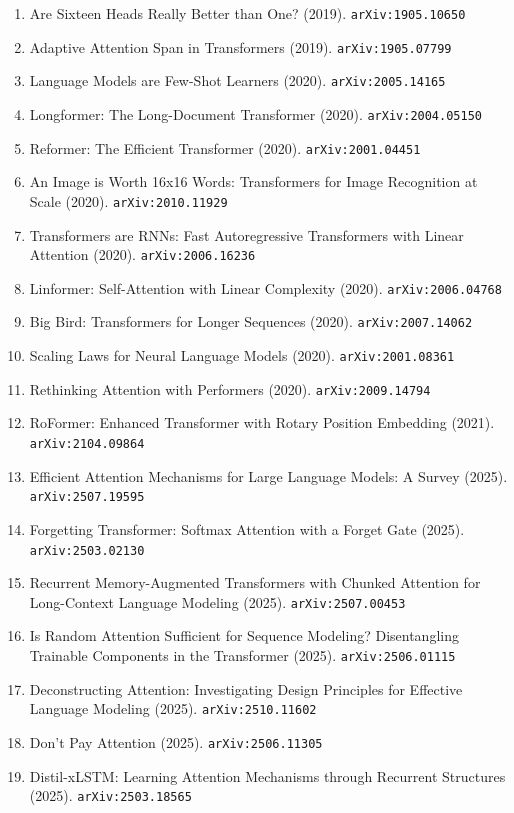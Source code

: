 \documentclass[11pt]{article}
\begin{document}
\begin{enumerate}
  \item Are Sixteen Heads Really Better than One? (2019). \texttt{arXiv:1905.10650}
  \item Adaptive Attention Span in Transformers (2019). \texttt{arXiv:1905.07799}
  \item Language Models are Few-Shot Learners (2020). \texttt{arXiv:2005.14165}
  \item Longformer: The Long-Document Transformer (2020). \texttt{arXiv:2004.05150}
  \item Reformer: The Efficient Transformer (2020). \texttt{arXiv:2001.04451}
  \item An Image is Worth 16x16 Words: Transformers for Image Recognition at
  Scale (2020). \texttt{arXiv:2010.11929}
  \item Transformers are RNNs: Fast Autoregressive Transformers with Linear
  Attention (2020). \texttt{arXiv:2006.16236}
  \item Linformer: Self-Attention with Linear Complexity (2020). \texttt{arXiv:2006.04768}
  \item Big Bird: Transformers for Longer Sequences (2020). \texttt{arXiv:2007.14062}
  \item Scaling Laws for Neural Language Models (2020). \texttt{arXiv:2001.08361}
  \item Rethinking Attention with Performers (2020). \texttt{arXiv:2009.14794}
  \item RoFormer: Enhanced Transformer with Rotary Position Embedding (2021). \texttt{arXiv:2104.09864}
  \item Efficient Attention Mechanisms for Large Language Models: A Survey (2025). \texttt{arXiv:2507.19595}
  \item Forgetting Transformer: Softmax Attention with a Forget Gate (2025). \texttt{arXiv:2503.02130}
  \item Recurrent Memory-Augmented Transformers with Chunked Attention for Long-Context Language Modeling (2025). \texttt{arXiv:2507.00453}
  \item Is Random Attention Sufficient for Sequence Modeling? Disentangling Trainable Components in the Transformer (2025). \texttt{arXiv:2506.01115}
  \item Deconstructing Attention: Investigating Design Principles for Effective Language Modeling (2025). \texttt{arXiv:2510.11602}
  \item Don't Pay Attention (2025). \texttt{arXiv:2506.11305}
  \item Distil-xLSTM: Learning Attention Mechanisms through Recurrent Structures (2025). \texttt{arXiv:2503.18565}

\end{enumerate}
\end{document}
